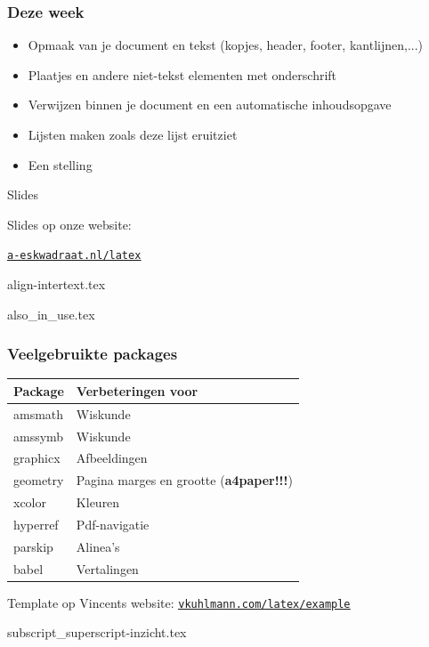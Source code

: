\documentclass{cursuspresentatie}
\def\importslide#1#2{%
	{#2}
}
\begin{document}
\begin{frame}
\frametitle{Deze week}
\begin{itemize}
    \item Opmaak van je document en tekst (kopjes, header, footer, kantlijnen,...)
    \item Plaatjes en andere niet-tekst elementen met onderschrift
    \item Verwijzen binnen je document en een automatische inhoudsopgave
    \item Lijsten maken zoals deze lijst eruitziet
    \item Een stelling
\end{itemize}
\end{frame}

\begin{frame}{Slides}
    \begin{center}
        \huge Slides op onze website:

        \bigskip

        \huge
        \href{https://www.a-eskwadraat.nl/latex}{\ul{\texttt{a-eskwadraat.nl/latex}}}
    \end{center}
\end{frame}


\importslide{math}{align-intertext.tex}
\importslide{math}{also_in_use.tex}


\begin{frame}
	\frametitle{Veelgebruikte packages}

	\begin{tabularx}{\textwidth}{X l}
		\toprule
		Package & Verbeteringen voor\\
		\midrule
		amsmath & Wiskunde \\
		amssymb & Wiskunde \\
		graphicx & Afbeeldingen \\
		geometry & Pagina marges en grootte (\textbf{a4paper!!!})\\
		xcolor & Kleuren \\
		hyperref & Pdf-navigatie \\
		parskip & Alinea's\\
		babel & Vertalingen\\
		\bottomrule
	\end{tabularx}
	\medskip

	Template op Vincents website: \href{https://vkuhlmann.com/latex/example}{\ul{\texttt{vkuhlmann.com/latex/example}}}
\end{frame}

\importslide{math}{subscript_superscript-inzicht.tex}
\end{document}
